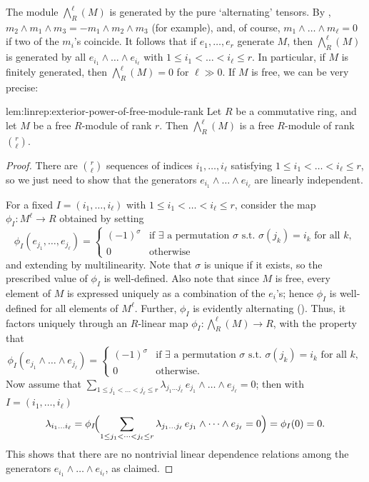 The module $\bigwedge^\ell_R(M)$ is generated by the pure
`alternating' tensors. By ,
$m_2 \wedge m_1 \wedge m_3 = -m_1 \wedge m_2 \wedge m_3$ (for
example), and, of course, $m_1 \wedge \dots \wedge m_\ell = 0$ if two
of the $m_i$'s coincide. It follows that if $e_1, \dots, e_r$ generate
$M$, then $\bigwedge^\ell_R(M)$ is generated by all
$e_{i_1} \wedge \dots \wedge e_{i_\ell}$ with
$1 \leq i_1 < \dots < i_\ell \leq r$. In particular, if $M$ is
finitely generated, then $\bigwedge^\ell_R(M) = 0$ for $\ell \gg 0$.
If $M$ is free, we can be very precise:
\begin{lem}{}{lem:linrep:exterior-power-of-free-module-rank}
  Let $R$ be a commutative ring, and let $M$ be a free $R$-module of
  rank $r$. Then $\bigwedge^\ell_R(M)$ is a free $R$-module of rank
  $\binom{r}{\ell}$.
\end{lem}
\begin{proof}
  There are $\binom{r}{\ell}$ sequences of indices
  $i_1, \dots, i_\ell$ satisfying
  $1 \leq i_1 < \dots < i_\ell \leq r$, so we just need to show that
  the generators $e_{i_1} \wedge \dots \wedge e_{i_\ell}$ are linearly
  independent.

  For a fixed $I = (i_1, \dots, i_\ell)$ with
  $1 \leq i_1 < \dots < i_\ell \leq r$, consider the map
  $\phi_I : M^\ell \to R$ obtained by setting
  \[
    \phi_I(e_{j_1}, \dots, e_{j_\ell}) = \begin{cases} (-1)^\sigma &
      \text{if } \exists \text{ a permutation } \sigma
                                                                     \text{ s.t.\ } \sigma(j_k) = i_k \text{ for all } k, \\
      0 & \text{otherwise}
    \end{cases}
  \]
  and extending by multilinearity. Note that $\sigma$ is unique if it
  exists, so the prescribed value of $\phi_I$ is well-defined. Also
  note that since $M$ is free, every element of $M$ is expressed
  uniquely as a combination of the $e_i$'s; hence $\phi_I$ is
  well-defined for all elements of $M^\ell$. Further, $\phi_I$ is
  evidently alternating
  (). Thus, it
  factors uniquely through an $R$-linear map
  $\phi_I : \bigwedge^\ell_R(M) \to R$, with the property that
  \[
    \phi_I(e_{j_1} \wedge \dots \wedge e_{j_\ell}) = \begin{cases}
      (-1)^\sigma & \text{if } \exists \text{ a permutation } \sigma
                    \text{ s.t.\ } \sigma(j_k) = i_k \text{ for all } k, \\
      0 & \text{otherwise.}
    \end{cases}
  \]
  Now assume that
  $\sum_{1 \leq j_1 < \dots < j_\ell \leq r} \lambda_{j_1 \dots
    j_\ell}\, e_{j_1} \wedge \dots \wedge e_{j_\ell} = 0$; then with
  $I = (i_1, \dots, i_\ell)$
  \[
    \lambda_{i_1 \dots i_\ell} = \phi_I\!\Bigl( \sum_{1 \leq j_1 <
      \dots < j_\ell \leq r} \lambda_{j_1 \dots j_\ell}\, e_{j_1}
    \wedge \dots \wedge e_{j_\ell} = 0 \Bigr) = \phi_I(0) = 0.
  \]
  This shows that there are no nontrivial linear dependence relations
  among the generators $e_{i_1} \wedge \dots \wedge e_{i_\ell}$, as
  claimed.
\end{proof}
